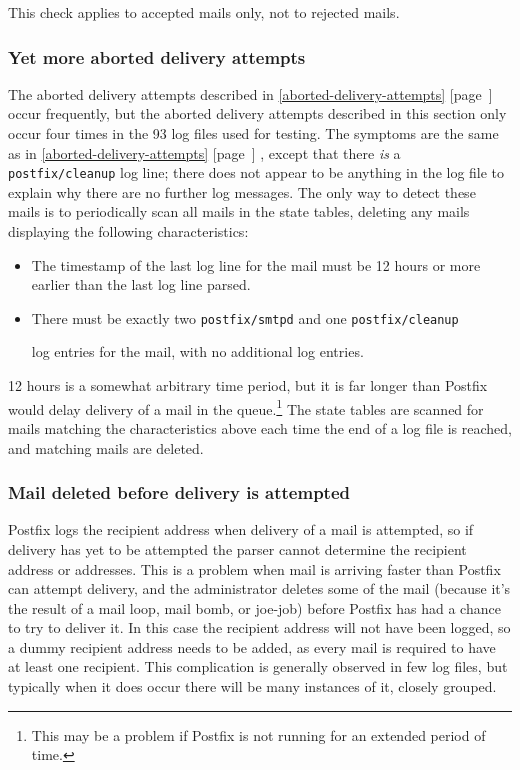 \documentclass[a4paper,12pt,draft]{article}
\newcommand{\refwithpage}[1]{%
    \empty{}\ref{#1} [page~\pageref{#1}]%
}
\newcommand{\sectionref}[1]{%
    \textsection{}\refwithpage{#1}%
}
\newcommand{\daemon}[1]{%
    \texttt{postfix/#1}%
}
\newcommand{\numberOFlogFILES}[0]{%
    93%
}
\newcounter{dummy}
\begin{document}
This check applies to accepted mails only, not to rejected mails.

\subsubsection{Yet more aborted delivery attempts}

\label{yet-more-aborted-delivery-attempts}

The aborted delivery attempts described in
\sectionref{aborted-delivery-attempts} occur frequently, but the aborted
delivery attempts described in this section only occur four times in the
\numberOFlogFILES{} log files used for testing.  The symptoms are the same
as in \sectionref{aborted-delivery-attempts}, except that there
\textit{is\/} a \daemon{cleanup} log line; there does not appear to be
anything in the log file to explain why there are no further log messages.
The only way to detect these mails is to periodically scan all mails in the
state tables, deleting any mails displaying the following characteristics:

\begin{itemize}

    \item The timestamp of the last log line for the mail must be 12 hours
        or more earlier than the last log line parsed.

    \item There must be exactly two \daemon{smtpd} and one \daemon{cleanup}
        log entries for the mail, with no additional log entries.

\end{itemize}

12 hours is a somewhat arbitrary time period, but it is far longer than
Postfix would delay delivery of a mail in the queue.\footnote{This may be a
problem if Postfix is not running for an extended period of time.}  The
state tables are scanned for mails matching the characteristics above each
time the end of a log file is reached, and matching mails are deleted.

\subsubsection{Mail deleted before delivery is attempted}

\label{Mail deleted before delivery is attempted}

Postfix logs the recipient address when delivery of a mail is attempted, so
if delivery has yet to be attempted the parser cannot determine the
recipient address or addresses.  This is a problem when mail is arriving
faster than Postfix can attempt delivery, and the administrator deletes
some of the mail (because it's the result of a mail loop, mail bomb, or
joe-job) before Postfix has had a chance to try to deliver it.  In this
case the recipient address will not have been logged, so a dummy recipient
address needs to be added, as every mail is required to have at least one
recipient.  This complication is generally observed in few log files, but
typically when it does occur there will be many instances of it, closely
grouped.
\end{document}
